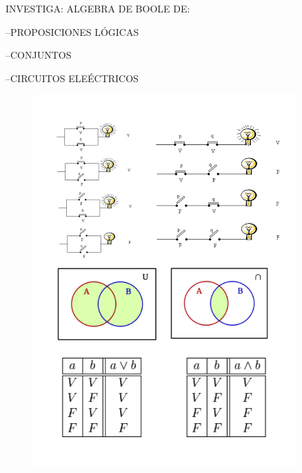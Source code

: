 \clearpage


 INVESTIGA: ALGEBRA DE BOOLE DE:

\small{\hspace{1cm} --PROPOSICIONES LÓGICAS} 

\small{\hspace{1cm} --CONJUNTOS}

\small{\hspace{1cm} --CIRCUITOS ELEÉCTRICOS}
	
	\begin{figure}[H]
		\centering
		\includegraphics[width=0.9\textwidth]{imagenes/apendices/APENDICESIM32.png}
	\end{figure}    
	
	
	
	
	

